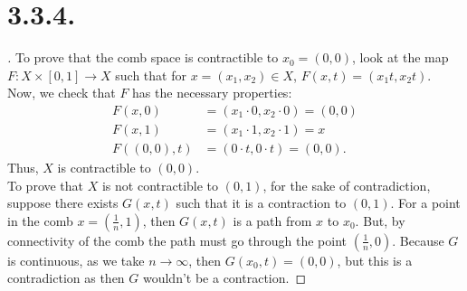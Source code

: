 \documentclass{article}
\begin{document}
\section*{3.3.4.}
\begin{proof}[\unskip\nopunct]
    To prove that the comb space is contractible to $x_0 = (0, 0)$, look at the map $F:X \times [0, 1] \to X$ such that for $x = (x_1, x_2) \in X$, $F(x, t) = (x_1t, x_2t)$. Now, we check that $F$ has the necessary properties:
    \begin{align*}
        F(x, 0) &= (x_1 \cdot 0, x_2 \cdot 0) = (0, 0) \\
        F(x, 1) &= (x_1 \cdot 1, x_2 \cdot 1) = x \\
        F((0, 0), t) &= (0 \cdot t, 0 \cdot t) = (0, 0).
    \end{align*}
    Thus, $X$ is contractible to $(0, 0)$. \\

    To prove that $X$ is not contractible to $(0, 1)$, for the sake of contradiction, suppose there exists $G(x, t)$ such that it is a contraction to $(0, 1)$. For a point in the comb $x  = \left(\frac{1}{n}, 1\right)$, then $G(x, t)$ is a path from $x$ to $x_0$. But, by connectivity of the comb the path must go through the point $\left(\frac{1}{n}, 0 \right)$. Because $G$ is continuous, as we take $n \to \infty$, then $G(x_0, t) = (0, 0)$, but this is a contradiction as then $G$ wouldn't be a contraction. 
    
\end{proof}
\end{document}
